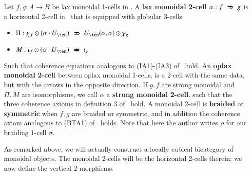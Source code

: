 \begin{defn}\label{Def:monverttrans}
Let $f, g:A \rightarrow B$ be lax monoidal 1-cells in \fB. A {\bf lax monoidal 2-cell} $\alpha: f \xslashedRightarrow{} g$ is a horizontal 2-cell in \fB\ that is equipped with globular 3-cells
\begin{itemize}
\item $\Pi: \chi_f \horc (\alpha \comp U_{\ten}) \xslashedRightarrow{} U_{\ten}(\alpha, \alpha) \horc \chi_g$
\item $M: \iota_f \horc (\alpha \comp U_{\ten}) \xslashedRightarrow{} \iota_g$
\end{itemize}

Such that coherence equations analogous to (IA1)-(IA3) of~\cite{gg:ldstr-tricat} hold.
An {\bf oplax monoidal 2-cell} between oplax monoidal 1-cells, is a 2-cell with the same data, but with the arrows in the opposite direction. If $g,f$ are strong monoidal and $\Pi, M$ are isomorphisms, we call $\alpha$ a {\bf strong monoidal 2-cell}.
such that the three coherence axioms in definition 3 of~\cite{gg:ldstr-tricat} hold.
A monoidal 2-cell is {\bf braided} or {\bf symmetric} when $f,g$ are braided or symmetric, and in addition the coherence axiom analogous to (BTA1) of~\cite[p143]{mccrudden:bal-coalgb} holds. Note that here the author writes $\rho$ for our braiding 1-cell $\sigma$.
\end{defn}

As remarked above, we will actually construct a locally cubical bicategory of monoidal objects.
The monoidal 2-cells will be the horizontal 2-cells therein; we now define the vertical 2-morphisms.

